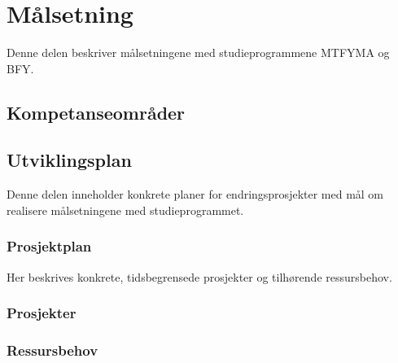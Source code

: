 \documentclass{memoir}
\begin{document}

\part{Målsetning}

Denne delen beskriver målsetningene med studieprogrammene MTFYMA og BFY.


\chapter{Kompetanseområder}






\appendix

\chapter{Utviklingsplan}

Denne delen inneholder konkrete planer for endringsprosjekter med mål om realisere målsetningene med studieprogrammet.

\section{Prosjektplan}

Her beskrives konkrete, tidsbegrensede prosjekter og tilhørende ressursbehov.

\section{Prosjekter}






\section{Ressursbehov}
\end{document}
